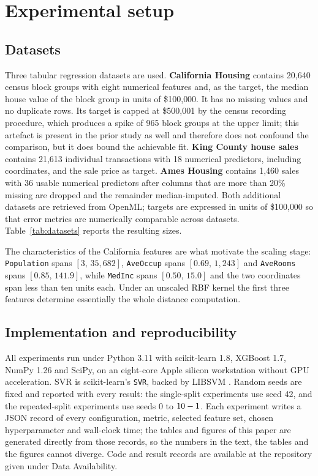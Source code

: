 \documentclass[pdflatex,sn-mathphys-num]{sn-jnl}
\begin{document}
\section{Experimental setup}\label{sec:setup}

\subsection{Datasets}\label{sec:datasets}
Three tabular regression datasets are used. \textbf{California Housing} \cite{pace1997,pedregosa2011} contains 20{,}640 census block groups with eight numerical features and, as the target, the median house value of the block group in units of \$100{,}000. It has no missing values and no duplicate rows. Its target is capped at \$500{,}001 by the census recording procedure, which produces a spike of 965 block groups at the upper limit; this artefact is present in the prior study as well and therefore does not confound the comparison, but it does bound the achievable fit. \textbf{King County house sales} contains 21{,}613 individual transactions with 18 numerical predictors, including coordinates, and the sale price as target. \textbf{Ames Housing} \cite{decock2011} contains 1{,}460 sales with 36 usable numerical predictors after columns that are more than 20\% missing are dropped and the remainder median-imputed. Both additional datasets are retrieved from OpenML; targets are expressed in units of \$100{,}000 so that error metrics are numerically comparable across datasets. Table~\ref{tab:datasets} reports the resulting sizes.

The characteristics of the California features are what motivate the scaling stage: \texttt{Population} spans $[3,\,35{,}682]$, \texttt{AveOccup} spans $[0.69,\,1{,}243]$ and \texttt{AveRooms} spans $[0.85,\,141.9]$, while \texttt{MedInc} spans $[0.50,\,15.0]$ and the two coordinates span less than ten units each. Under an unscaled RBF kernel the first three features determine essentially the whole distance computation.

\subsection{Implementation and reproducibility}
All experiments run under Python 3.11 with scikit-learn 1.8, XGBoost 1.7, NumPy 1.26 and SciPy, on an eight-core Apple silicon workstation without GPU acceleration. SVR is scikit-learn's \texttt{SVR}, backed by LIBSVM \cite{chang2011}. Random seeds are fixed and reported with every result: the single-split experiments use seed 42, and the repeated-split experiments use seeds $0$ to $10{}-1$. Each experiment writes a JSON record of every configuration, metric, selected feature set, chosen hyperparameter and wall-clock time; the tables and figures of this paper are generated directly from those records, so the numbers in the text, the tables and the figures cannot diverge. Code and result records are available at the repository given under Data Availability.
\end{document}
